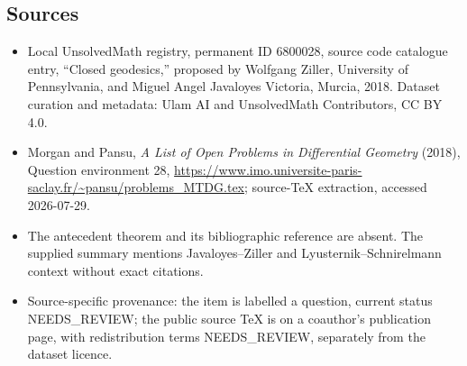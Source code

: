 \documentclass[11pt]{article}
\begin{document}
\subsection{Sources}
\begin{itemize}
\item Local UnsolvedMath registry, permanent ID 6800028, source code catalogue entry, ``Closed geodesics,'' proposed by Wolfgang Ziller, University of Pennsylvania, and Miguel Angel Javaloyes Victoria, Murcia, 2018. Dataset curation and metadata: Ulam AI and UnsolvedMath Contributors, CC BY 4.0.
\item Morgan and Pansu, \emph{A List of Open Problems in Differential Geometry} (2018), Question environment 28, \url{https://www.imo.universite-paris-saclay.fr/~pansu/problems_MTDG.tex}; source-TeX extraction, accessed 2026-07-29.
\item The antecedent theorem and its bibliographic reference are absent. The supplied summary mentions Javaloyes--Ziller and Lyusternik--Schnirelmann context without exact citations.
\item Source-specific provenance: the item is labelled a question, current status NEEDS\_REVIEW; the public source TeX is on a coauthor's publication page, with redistribution terms NEEDS\_REVIEW, separately from the dataset licence.
\end{itemize}
\end{document}
